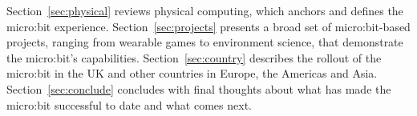 Section~\ref{sec:physical} reviews physical computing, which anchors
and defines the micro:bit experience. Section~\ref{sec:projects}
presents a broad set of micro:bit-based projects, ranging
from wearable games to environment science, that demonstrate
the micro:bit's capabilities.  Section~\ref{sec:country}
describes the rollout of the micro:bit in the UK and other countries
in Europe, the Americas and Asia. Section~\ref{sec:conclude}
concludes with final thoughts about what has made the micro:bit
successful to date and what comes next.















